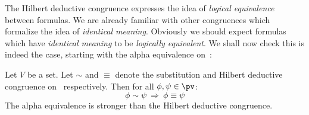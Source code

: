 The Hilbert deductive congruence expresses the idea of {\em logical
equivalence} between formulas. We are already familiar with other
congruences which formalize the idea of {\em identical meaning}.
Obviously we should expect formulas which have {\em identical
meaning} to be {\em logically equivalent}. We shall now check this
is indeed the case, starting with the alpha equivalence on
\pv\,:

\begin{prop}\label{logic:prop:FOPL:HDC:substitution:v:HDC}
Let $V$ be a set. Let $\sim$ and $\equiv$ denote the substitution
and Hilbert deductive congruence on \pv\ respectively. Then for all
$\phi,\psi\in\pv$:
    \[
    \phi\sim\psi\ \Rightarrow\ \phi\equiv\psi
    \]
The alpha equivalence is stronger than the Hilbert deductive
congruence.
\end{prop}
